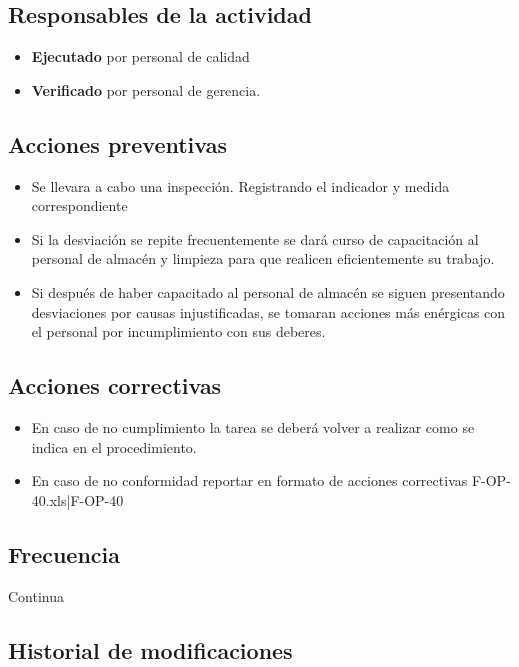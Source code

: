 \subsection{Responsables de la actividad}

\begin{itemize}
	\item \textbf{Ejecutado} por personal de calidad
	\item \textbf{Verificado} por personal de gerencia.
\end{itemize}

\subsection{Acciones preventivas}

\begin{itemize}
	\item Se llevara a cabo una inspección. Registrando el indicador y medida correspondiente
	\item Si la desviación se repite frecuentemente se dará curso de capacitación al personal de almacén y limpieza para que realicen eficientemente su trabajo.
	\item Si después de haber capacitado al personal de almacén se siguen presentando desviaciones por causas injustificadas, se tomaran acciones más enérgicas con el personal por incumplimiento con sus deberes.
\end{itemize}

\subsection{Acciones correctivas}

\begin{itemize}
	\item En caso de no cumplimiento la tarea se deberá volver a realizar como se indica en el procedimiento.
	\item En caso de no conformidad reportar en formato de acciones correctivas F-OP-40.xls|F-OP-40
\end{itemize}

\subsection{Frecuencia}

Continua

\subsection{Historial de modificaciones}

